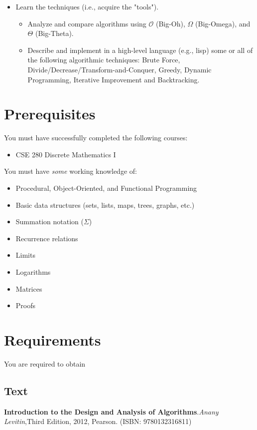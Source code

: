 \documentclass[12pt]{amsart}
\begin{document}
\begin{itemize}
\item Learn the techniques (i.e., acquire the "tools").
	\begin{itemize}
          \item Analyze and compare algorithms using $\mathcal{O}$ (Big-Oh), $\Omega$ (Big-Omega), and
              $\Theta$ (Big-Theta).
          \item Describe and implement in a high-level language (e.g., lisp)
              some or all of the following algorithmic techniques: Brute
              Force, Divide/Decrease/Transform-and-Conquer, Greedy, Dynamic
              Programming, Iterative Improvement and Backtracking.
      	\end{itemize}
\end{itemize}
\section{Prerequisites}

  You must have successfully completed the following courses:
\begin{itemize}
    \item CSE 280 Discrete Mathematics I
\end{itemize}
  You must have \textit{some} working knowledge of:
\begin{itemize}
     \item Procedural, Object-Oriented, and Functional Programming
     \item Basic data structures (sets, lists, maps, trees, graphs, etc.)
     \item Summation notation ($\Sigma$)
     \item Recurrence relations
     \item Limits
     \item Logarithms
     \item Matrices
     \item Proofs
\end{itemize}

\section{Requirements}
You are required to obtain
\subsection{Text} 
	\textbf{Introduction to the Design and Analysis of Algorithms}.\textit{Anany Levitin},Third Edition, 2012, Pearson. (ISBN: 9780132316811)
\end{document}
